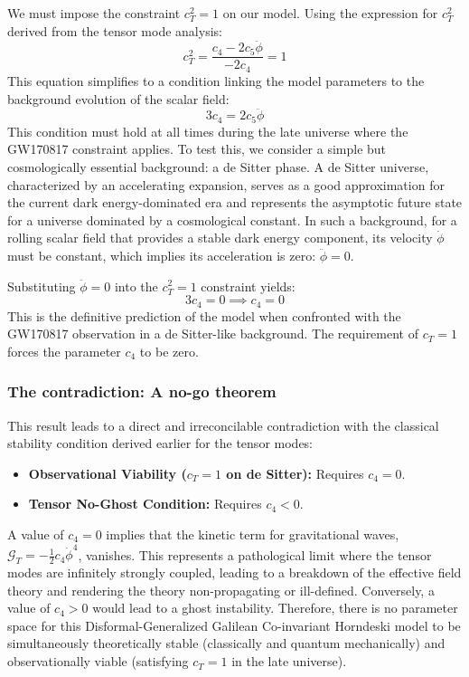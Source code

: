 \documentclass[twocolumn]{aastex631}
\begin{document}
We must impose the constraint $c_T^2 = 1$ on our model. Using the expression for $c_T^2$ derived from the tensor mode analysis:
\begin{equation}
    c_T^2 = \frac{c_4 - 2c_5\ddot{\phi}}{-2c_4} = 1
\end{equation}
This equation simplifies to a condition linking the model parameters to the background evolution of the scalar field:
\begin{equation}
    3c_4 = 2c_5\ddot{\phi}
\end{equation}
This condition must hold at all times during the late universe where the GW170817 constraint applies. To test this, we consider a simple but cosmologically essential background: a de Sitter phase. A de Sitter universe, characterized by an accelerating expansion, serves as a good approximation for the current dark energy-dominated era and represents the asymptotic future state for a universe dominated by a cosmological constant. In such a background, for a rolling scalar field that provides a stable dark energy component, its velocity $\dot{\phi}$ must be constant, which implies its acceleration is zero: $\ddot{\phi} = 0$.

Substituting $\ddot{\phi} = 0$ into the $c_T^2 = 1$ constraint yields:
\begin{equation}
    3c_4 = 0 \implies c_4 = 0
\end{equation}
This is the definitive prediction of the model when confronted with the GW170817 observation in a de Sitter-like background. The requirement of $c_T = 1$ forces the parameter $c_4$ to be zero.

\subsubsection{The contradiction: A no-go theorem}
This result leads to a direct and irreconcilable contradiction with the classical stability condition derived earlier for the tensor modes:
\begin{itemize}
    \item \textbf{Observational Viability ($c_T=1$ on de Sitter):} Requires $c_4 = 0$.
    \item \textbf{Tensor No-Ghost Condition:} Requires $c_4 < 0$.
\end{itemize}
A value of $c_4 = 0$ implies that the kinetic term for gravitational waves, $\mathcal{G}_T = -\frac{1}{2} c_4 \dot{\phi}^4$, vanishes. This represents a pathological limit where the tensor modes are infinitely strongly coupled, leading to a breakdown of the effective field theory and rendering the theory non-propagating or ill-defined. Conversely, a value of $c_4 > 0$ would lead to a ghost instability. Therefore, there is no parameter space for this Disformal-Generalized Galilean Co-invariant Horndeski model to be simultaneously theoretically stable (classically and quantum mechanically) and observationally viable (satisfying $c_T=1$ in the late universe).
\end{document}
